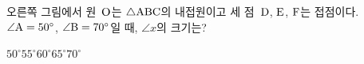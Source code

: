 \noindent\begin{minipage}[t]{0.58\linewidth}\vspace{0pt}\raggedright 오른쪽 그림에서 원~$\mathrm{O}$는 $\triangle\mathrm{ABC}$의 내접원이고 세 점~$\mathrm{D}$, $\mathrm{E}$, $\mathrm{F}$는 접점이다. $\angle\mathrm{A}=50^\circ$, $\angle\mathrm{B}=70^\circ$일 때, $\angle x$의 크기는?\end{minipage}\hfill\begin{minipage}[t]{0.4\linewidth}\vspace{0pt}\centering \resizebox{\ifdim\width>\linewidth\linewidth\else\width\fi}{!}{}\end{minipage}\par
\begin{choicesii}{$50^\circ$}{$55^\circ$}{$60^\circ$}{$65^\circ$}{$70^\circ$}\end{choicesii}
